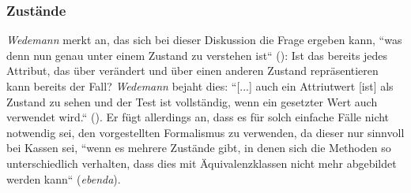 \subsubsection*{Zustände}
\textit{Wedemann} merkt an, das sich bei dieser Diskussion die Frage ergeben kann, ``was denn nun genau unter einem Zustand zu verstehen ist`` (\cite[48]{Wed09c}): Ist das bereits jedes Attribut, das über  verändert und über  einen anderen Zustand repräsentieren kann bereits der Fall? \textit{Wedemann} bejaht dies: ``[...] auch ein Attriutwert [ist] als Zustand zu sehen und der Test ist vollständig, wenn ein gesetzter Wert auch verwendet wird.`` (\cite[48]{Wed09c}).
Er fügt allerdings an, dass es für solch einfache Fälle nicht notwendig sei, den vorgestellten Formalismus zu verwenden, da dieser nur sinnvoll bei Kassen sei, ``wenn es mehrere Zustände gibt, in denen sich die Methoden so unterschiedlich verhalten, dass dies mit Äquivalenzklassen nicht mehr abgebildet werden kann`` (\textit{ebenda}).
